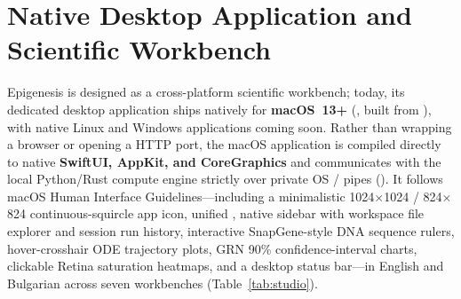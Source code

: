 \documentclass[10.5pt,a4paper]{article}
\begin{document}
\section{Native Desktop Application and Scientific Workbench}\label{sec:studio}

Epigenesis is designed as a cross-platform scientific workbench; today, its dedicated desktop application ships natively for \textbf{macOS~13+} (, built from ), with native Linux and Windows applications coming soon\texttrademark. Rather than wrapping a browser or opening a  HTTP port, the macOS application is compiled directly to native \textbf{SwiftUI, AppKit, and CoreGraphics} and communicates with the local Python/Rust compute engine strictly over private OS / pipes (). It follows macOS Human Interface Guidelines—including a minimalistic 1024$\times$1024 / 824$\times$824 continuous-squircle app icon, unified , native  sidebar with workspace file explorer and session run history, interactive SnapGene-style DNA sequence rulers, hover-crosshair ODE trajectory plots, GRN 90\% confidence-interval charts, clickable Retina saturation heatmaps, and a desktop status bar—in English and Bulgarian across seven workbenches (Table~\ref{tab:studio}).
\end{document}
